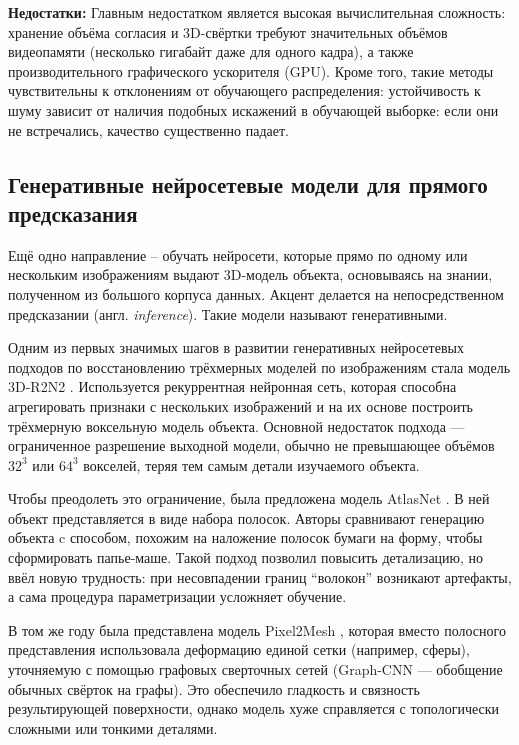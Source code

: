 \textbf{Недостатки:}
Главным недостатком является высокая вычислительная сложность: хранение объёма
согласия и 3D-свёртки требуют значительных объёмов видеопамяти (несколько
гигабайт даже для одного кадра), а также производительного графического
ускорителя (GPU). Кроме того, такие методы чувствительны к отклонениям от
обучающего распределения: устойчивость к шуму зависит от наличия подобных
искажений в обучающей выборке: если они не встречались, качество существенно
падает.

\subsection{Генеративные нейросетевые модели для прямого предсказания}

Ещё одно направление – обучать нейросети, которые прямо по одному или нескольким
изображениям выдают 3D-модель объекта, основываясь на знании, полученном из
большого корпуса данных. Акцент делается на непосредственном предсказании (англ.
\emph{inference}). Такие модели называют генеративными.

Одним из первых значимых шагов в развитии генеративных нейросетевых подходов по
восстановлению трёхмерных моделей по изображениям стала модель 3D-R2N2
\cite{choy20163dr2n2unifiedapproachsingle}. Используется рекуррентная
нейронная сеть, которая способна агрегировать признаки с нескольких изображений
и на их основе построить трёхмерную воксельную модель объекта. Основной
недостаток подхода — ограниченное разрешение выходной модели, обычно не
превышающее объёмов \(32^3\) или \(64^3\) вокселей, теряя тем самым детали
изучаемого объекта.

Чтобы преодолеть это ограничение, была предложена модель AtlasNet
\cite{groueix2018atlasnetpapiermacheapproachlearning}. В ней объект
представляется в виде набора полосок. Авторы сравнивают генерацию объекта c
способом, похожим на наложение полосок бумаги на форму, чтобы сформировать
папье-маше. Такой подход позволил повысить детализацию, но ввёл новую
трудность: при несовпадении границ ``волокон'' возникают артефакты, а сама процедура
параметризации усложняет обучение.

В том же году была представлена модель Pixel2Mesh
\cite{wang2018pixel2meshgenerating3dmesh}, которая вместо полосного
представления использовала деформацию единой сетки (например, сферы), уточняемую
с помощью графовых сверточных сетей (Graph-CNN — обобщение обычных свёрток на
графы). Это обеспечило гладкость и связность результирующей поверхности, однако
модель хуже справляется с топологически сложными или тонкими деталями.

